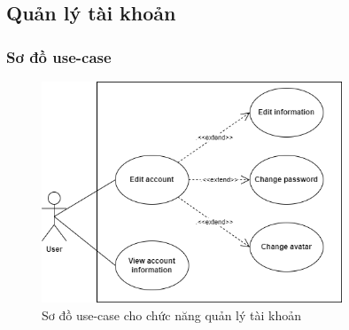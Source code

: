 \subsection{Quản lý tài khoản}
\subsubsection{Sơ đồ use-case}
\begin{figure}[H]
    \centering
    \includegraphics[width=0.8\textwidth]{Images/UseCase/Account.png}
    \caption{Sơ đồ use-case cho chức năng quản lý tài khoản}
\end{figure}

